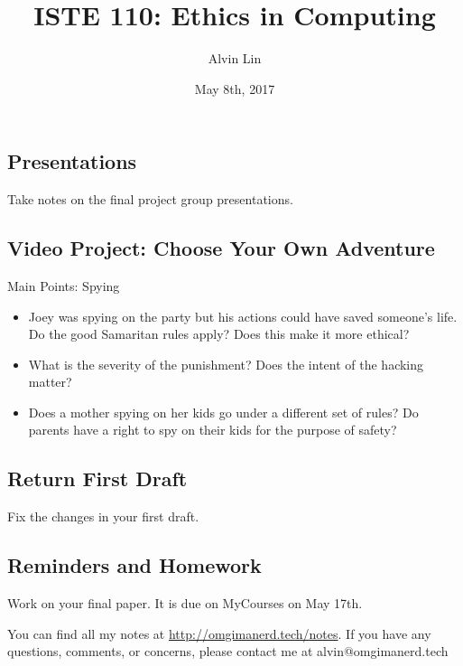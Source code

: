\documentclass[letterpaper, 12pt]{article}
\title{ISTE 110: Ethics in Computing}
\author{Alvin Lin}
\date{May 8th, 2017}
\begin{document}
\maketitle

\subsection*{Presentations}
Take notes on the final project group presentations.

\subsection*{Video Project: Choose Your Own Adventure}
Main Points: Spying
\begin{itemize}
  \item Joey was spying on the party but his actions could have saved someone's
    life. Do the good Samaritan rules apply? Does this make it more ethical?
  \item What is the severity of the punishment? Does the intent of the hacking
    matter?
  \item Does a mother spying on her kids go under a different set of rules? Do
    parents have a right to spy on their kids for the purpose of safety?
\end{itemize}

\subsection*{Return First Draft}
Fix the changes in your first draft.

\subsection*{Reminders and Homework}
Work on your final paper. It is due on MyCourses on May 17th.

\begin{center}
  You can find all my notes at \url{http://omgimanerd.tech/notes}. If you have
  any questions, comments, or concerns, please contact me at
  alvin@omgimanerd.tech
\end{center}
\end{document}
